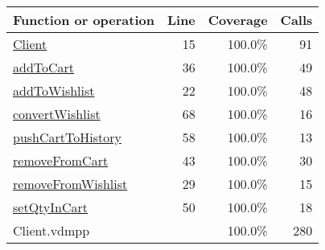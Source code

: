 \bigskip
\begin{longtable}{|l|r|r|r|}
\hline
Function or operation & Line & Coverage & Calls \\
\hline
\hline
\hyperref[Client:15]{Client} & 15&100.0\% & 91 \\
\hline
\hyperref[addToCart:36]{addToCart} & 36&100.0\% & 49 \\
\hline
\hyperref[addToWishlist:22]{addToWishlist} & 22&100.0\% & 48 \\
\hline
\hyperref[convertWishlist:68]{convertWishlist} & 68&100.0\% & 16 \\
\hline
\hyperref[pushCartToHistory:58]{pushCartToHistory} & 58&100.0\% & 13 \\
\hline
\hyperref[removeFromCart:43]{removeFromCart} & 43&100.0\% & 30 \\
\hline
\hyperref[removeFromWishlist:29]{removeFromWishlist} & 29&100.0\% & 15 \\
\hline
\hyperref[setQtyInCart:50]{setQtyInCart} & 50&100.0\% & 18 \\
\hline
\hline
Client.vdmpp & & 100.0\% & 280 \\
\hline
\end{longtable}

